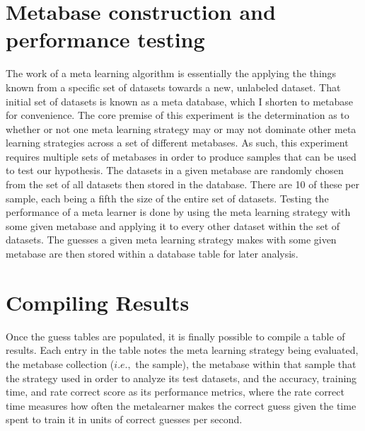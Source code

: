 \section{Metabase construction and performance testing}
The work of a meta learning algorithm is essentially the applying the things
known from a specific set of datasets towards a new, unlabeled dataset. That
initial set of datasets is known as a meta database, which I shorten to metabase
for convenience. The core premise of this experiment is the determination as to
whether or not one meta learning strategy may or may not dominate other
meta learning strategies across a set of different metabases. As such, this
experiment requires multiple sets of metabases in order to produce samples
that can be used to test our hypothesis. The datasets in a given metabase are
randomly chosen from the set of all datasets then stored in the database. There
are 10 of these per sample, each being a fifth the size of the entire set of
datasets. Testing the performance of a meta learner is done by using the
meta learning strategy with some given metabase and applying it to every other
dataset within the set of datasets. The guesses a given meta learning strategy
makes with some given metabase are then stored within a database table for later
analysis.

\section{Compiling Results}
Once the guess tables are populated, it is finally possible to compile a table
of results. Each entry in the table notes the meta learning strategy being
evaluated, the metabase collection ($i.e.,$ the sample), the metabase within that
sample that the strategy used in order to analyze its test datasets, and the
accuracy, training time, and rate correct score as its performance metrics,
where the rate correct time measures how often the metalearner makes the correct
guess given the time spent to train it in units of correct guesses per second.
